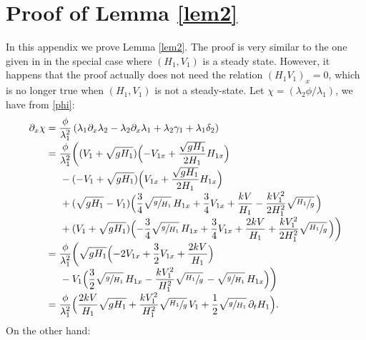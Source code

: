 \section{Proof of Lemma \ref{lem2}}
\label{sec:prooflem2}
In this appendix we prove Lemma \ref{lem2}. The proof is very similar to the {one} given in \cite{HS} in the special case where $(H_{1},V_{1})$ is a steady state. However, it happens that the proof actually does not need the relation $(H_{1}V_{1})_{x}=0$, which is no longer true when $(H_{1},V_{1})$ is not a steady-state. Let $\chi=(\lambda_{2}\phi/\lambda_{1})$, we have from \eqref{phi}:
\begin{equation}
\begin{split}
\partial_{x}\chi&=\frac{\phi}{\lambda_{1}^{2}}\left(\lambda_{1}\partial_{x}\lambda_{2}-\lambda_{2}\partial_{x}\lambda_{1}+\lambda_{2}\gamma_{1}+\lambda_{1}\delta_{2}\right)\\[-3pt]
&=\frac{\phi}{\lambda_{1}^{2}}\biggl((V_{1}+\sqrt{gH_{1}}) \Bigl(-V_{1x}+\frac{\sqrt{gH_{1}}}{2H_{1}}H_{1x}\Bigr)\\[-3pt]
&\hspace*{.5cm}-(-V_{1}+\sqrt{gH_{1}})\Bigl(V_{1x}+\frac{\sqrt{gH_{1}}}{2H_{1}}H_{1x}\Bigr)\\[-3pt]
&\hspace*{.5cm}+(\sqrt{gH_{1}}-V_{1}) \Bigl(\frac{3}{4}\sqrt{\sfrac{g}{H_{1}}}\,H_{1x}+\frac{3}{4}V_{1x}+\frac{kV}{H_{1}}-\frac{kV_{1}^{2}}{2H_{1}^{2}}\sqrt{\sfrac{H_{1}}{g}}\, \Bigr)\\[-3pt]
&\hspace*{.5cm}+(V_{1}+\sqrt{gH_{1}}) \Bigl(-\frac{3}{4}\sqrt{\sfrac{g}{H_{1}}}\,H_{1x}+\frac{3}{4}V_{1x}+\frac{2kV}{H_{1}}+\frac{kV_{1}^{2}}{2H_{1}^{2}}\sqrt{\sfrac{H_{1}}{g}}\, \Bigr)\biggr)\\[-3pt]
&=\frac{\phi}{\lambda_{1}^{2}}\biggl(\sqrt{gH_{1}} \Bigl(-2V_{1x}+\frac{3}{2}V_{1x}+\frac{2kV}{H_{1}} \Bigr)\\[-3pt]
&\hspace*{.5cm}-V_{1} \Bigl(\frac{3}{2}\sqrt{\sfrac{g}{H_{1}}}\,H_{1x}-\frac{kV_{1}^{2}}{H_{1}^{2}}\sqrt{\sfrac{H_{1}}{g}}\,-\sqrt{\sfrac{g}{H_{1}}}\,H_{1x} \Bigr)\biggr)\\[-3pt]
&=\frac{\phi}{\lambda_{1}^{2}} \Bigl(\frac{2kV}{H_{1}}\sqrt{gH_{1}}+\frac{kV_{1}^{2}}{H_{1}^{2}}\sqrt{\sfrac{H_{1}}{g}}\,V_{1}+\frac{1}{2}\sqrt{\sfrac{g}{H_{1}}}\,\partial_{t}H_{1} \Bigr).
\end{split}
\label{Le1}
\end{equation}
{On} the other hand:
